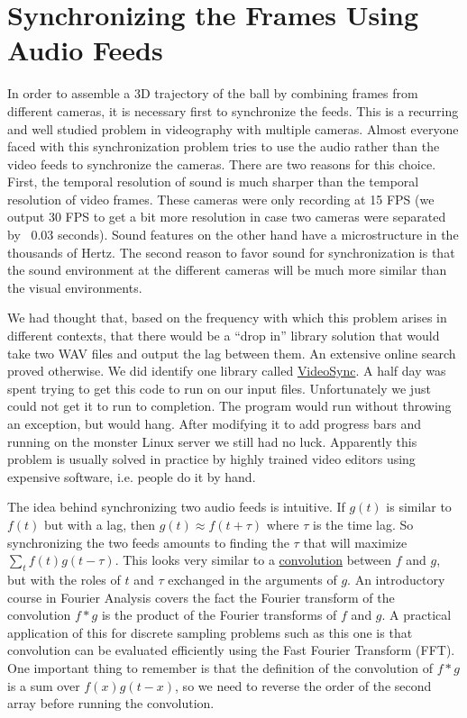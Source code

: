 \documentclass{article}
\begin{document}
\section{Synchronizing the Frames Using Audio Feeds}
In order to assemble a 3D trajectory of the ball by combining frames from different cameras,
it is necessary first to synchronize the feeds.  
This is a recurring and well studied problem in videography with multiple cameras.
Almost everyone faced with this synchronization problem tries to use the audio 
rather than the video feeds to synchronize the cameras.  There are two reasons for this choice.
First, the temporal resolution of sound is much sharper than the temporal resolution of video frames.
These cameras were only recording at 15 FPS 
(we output 30 FPS to get a bit more resolution in case two cameras were separated by ~0.03 seconds).
Sound features on the other hand have a microstructure in the thousands of Hertz.
The second reason to favor sound for synchronization is that the sound environment at the
different cameras will be much more similar than the visual environments.

We had thought that, based on the frequency with which this problem arises in different contexts,
that there would be a ``drop in'' library solution that would take two WAV files and output the lag
between them.  An extensive online search proved otherwise.  
We did identify one library called \href{https://github.com/allisonnicoledeal/VideoSync}{VideoSync}.
A half day was spent trying to get this code to run on our input files.
Unfortunately we just could not get it to run to completion.  
The program would run without throwing an exception, but would hang.
After modifying it to add progress bars and running on the monster Linux server we still had no luck.
Apparently this problem is usually solved in practice by highly trained video editors 
using expensive software, i.e. people do it by hand.

The idea behind synchronizing two audio feeds is intuitive.
If $g(t)$ is similar to $f(t)$ but with a lag, then $g(t) \approx f(t + \tau)$
where $\tau$ is the time lag.  So synchronizing the two feeds amounts to finding the $\tau$ that 
will maximize $\sum_t f(t) g(t - \tau)$.  This looks very similar to a 
\href{https://en.wikipedia.org/wiki/Convolution}{convolution} between $f$ and $g$,
but with the roles of $t$ and $\tau$ exchanged in the arguments of $g$.
An introductory course in Fourier Analysis covers
the fact the Fourier transform of the convolution
$f * g$ is the product of the Fourier transforms of $f$ and $g$.
A practical application of this for discrete sampling problems such as this one is that convolution
can be evaluated efficiently using the Fast Fourier Transform (FFT).
One important thing to remember is that the definition of the convolution of $f*g$ is a sum over
$f(x) g(t-x)$, so we need to reverse the order of the second array before running the convolution.
\end{document}
